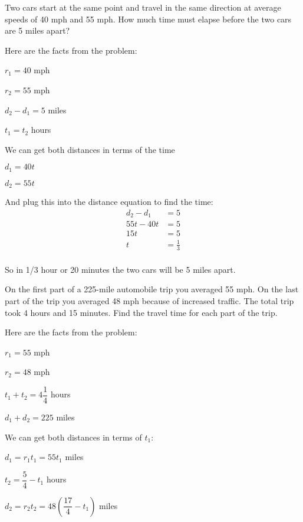 \documentclass[fleqn,addpoints]{exam}
\begin{document}
\begin{questions}
\question
Two cars start at the same point and travel in the same direction at average speeds of 40 mph and 55 mph.  How much time
must elapse before the two cars are 5 miles apart?

\begin{solution}
Here are the facts from the problem:
\begin{itemize*}
  \item $r_1 = 40$ mph
  \item $r_2 = 55$ mph
  \item $d_2 - d_1 = 5$ miles
  \item $t_1 = t_2$ hours
\end{itemize*}

We can get both distances in terms of the time
\begin{itemize*}
  \item $d_1 = 40t$
  \item $d_2 = 55t$
\end{itemize*}

And plug this into the distance equation to find the time:
\begin{align*}
  d_2 - d_1 &= 5 \\
  55t - 40t &= 5 \\
  15t  &= 5 \\
  t  &= \frac{1}{3} \\
\end{align*}

So in 1/3 hour or 20 minutes the two cars will be 5 miles apart.

\end{solution}

\question
On the first part of a 225-mile automobile trip you averaged 55 mph.  On the last part of the trip you averaged 48 mph
because of increased traffic.  The total trip took 4 hours and 15 minutes.  Find the travel time for each part of the
trip.

\begin{solution}
Here are the facts from the problem:
\begin{itemize*}
  \item $r_1 = 55$ mph
  \item $r_2 = 48$ mph
  \item $t_1 + t_2 = 4 \dfrac{1}{4}$ hours
  \item $d_1 + d_2 = 225$ miles
\end{itemize*}

We can get both distances in terms of $t_1$:
\begin{itemize*}
  \item $d_1 = r_1t_1 = 55t_1$ miles
  \item $t_2 = \dfrac{5}{4} - t_1$ hours
  \item $d_2 = r_2t_2 = 48 \left( \dfrac{17}{4} - t_1 \right)$ miles
\end{itemize*}


\end{solution}
\end{questions}
\end{document}
